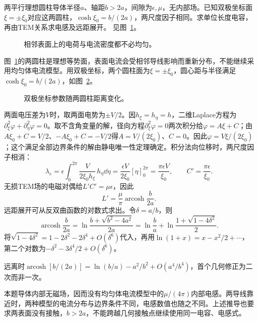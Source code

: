 \begin{exercise}[双线表面电流的双极坐标解]\label{ex:i2-h4}
两平行理想圆柱导体半径$a$、轴距$b>2a$，间隙为$\epsilon,\mu$，无内部场。已知双极坐标面$\xi=\pm\xi_0$对应这两圆柱，$\cosh\xi_0=b/(2a)$，两尺度因子相同。求单位长度电容，再由TEM关系求电感及远距展开。 见图~\ref{fig:i2-h4-q}。
\end{exercise}

\begin{figure}[H]\centering
{}
\caption{相邻表面上的电荷与电流密度都不必均匀。}\label{fig:i2-h4-q}
\end{figure}
\begin{solution}
图~\ref{fig:i2-h4-q}的两圆柱是理想等势面，表面电流会受相邻导线影响而重新分布，不能继续采用均匀体电流模型。用双极坐标，两个圆柱面为$\xi=\pm\xi_0$，圆心距与半径满足$\cosh\xi_0=b/(2a)$，如图~\ref{fig:i2-h4-s}。


\begin{figure}[H]\centering
{}
\caption{双极坐标参数随两圆柱距离变化。}\label{fig:i2-h4-s}
\end{figure}

两面电压差为$V$时，取两面电势为$\pm V/2$。因$h_\xi=h_\eta=h$，二维Laplace方程为$\partial_\xi^2\varphi+\partial_\eta^2\varphi=0$。取不含角变量的解，径向方程$\partial_\xi^2\varphi=0$两次积分给$\varphi=A\xi+C$；由$A\xi_0+C=V/2$、$-A\xi_0+C=-V/2$得$A=V/(2\xi_0)$、$C=0$。因此$\varphi=V\xi/(2\xi_0)$；这个满足全部边界条件的解由静电唯一性定理确定。积分法向位移时，两尺度因子相消：
\[\lambda_e=\epsilon\int_0^{2\pi}
\frac{V}{2\xi_0h_\xi}\,h_\eta\dd\eta
=\frac{\epsilon V}{2\xi_0}[\eta]_0^{2\pi}
=\frac{\pi\epsilon V}{\xi_0},\qquad
C'=\frac{\pi\epsilon}{\xi_0}.
\]
无损TEM场的电磁对偶给$L'C'=\mu\epsilon$，因此
\[\boxed{L'=\frac{\mu}{\pi}\operatorname{arcosh}\frac b{2a}}.
\]
远距展开可从反双曲函数的对数式求出。令$\delta=a/b$，则
\[
\operatorname{arcosh}\frac b{2a}
=\ln\frac{b+\sqrt{b^2-4a^2}}{2a}
=\ln\frac ba+\ln\frac{1+\sqrt{1-4\delta^2}}2.
\]
将$\sqrt{1-4\delta^2}=1-2\delta^2-2\delta^4+O(\delta^6)$代入，再用$\ln(1+x)=x-x^2/2+\cdots$，第二个对数为$-\delta^2-3\delta^4/2+O(\delta^6)$。

远离时$\operatorname{arcosh}[b/(2a)]=\ln(b/a)-a^2/b^2+O(a^4/b^4)$，首个几何修正为二次而非一次。

本题导体内部无磁场，因而没有均匀体电流模型中的$\mu/(4\pi)$内部电感。两导线靠近时，两种模型的电流分布与边界条件不同，电感数值也随之不同。上述推导也要求两表面没有接触，$b>2a$，不能跨越几何接触点继续使用同一电容、电感式。
\end{solution}

